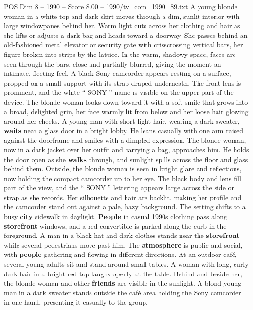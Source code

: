 \begin{textsample}{POS Dim 8 – 1990 – Score 8.00 – 1990/tv\_com\_1990\_89.txt}  \label{ex:f8_pos_062}
A young blonde woman in a white top and dark skirt moves through a dim, sunlit interior with large windowpanes behind her.
Warm light cuts across her clothing and hair as she lifts or adjusts a dark bag and heads toward a doorway.
She passes behind an old-fashioned metal elevator or security gate with crisscrossing vertical bars, her figure broken into strips by the lattice.
In the warm, shadowy space, faces are seen through the bars, close and partially blurred, giving the moment an intimate, fleeting feel.
A black Sony camcorder appears resting on a surface, propped on a small support with its strap draped underneath.
The front lens is prominent, and the white “ SONY ” name is visible on the upper part of the device.
The blonde woman looks down toward it with a soft smile that grows into a broad, delighted grin, her face warmly lit from below and her loose hair glowing around her cheeks.
A young man with short light hair, wearing a dark sweater, \textbf{waits} near a glass door in a bright lobby.
He leans casually with one arm raised against the doorframe and smiles with a dimpled expression.
The blonde woman, now in a dark jacket over her outfit and carrying a bag, approaches him.
He holds the door open as she \textbf{walks} through, and sunlight spills across the floor and glass behind them.
Outside, the blonde woman is seen in bright glare and reflections, now holding the compact camcorder up to her eye.
The black body and lens fill part of the view, and the “ SONY ” lettering appears large across the side or strap as she records.
Her silhouette and hair are backlit, making her profile and the camcorder stand out against a pale, hazy background.
The setting shifts to a busy \textbf{city} sidewalk in daylight. \textbf{People} in casual 1990s clothing pass along \textbf{storefront} windows, and a red convertible is parked along the curb in the foreground.
A man in a black hat and dark clothes stands near the \textbf{storefront} while several pedestrians move past him.
The \textbf{atmosphere} is public and social, with \textbf{people} gathering and flowing in different directions.
At an outdoor café, several young adults sit and stand around small tables.
A woman with long, curly dark hair in a bright red top laughs openly at the table.
Behind and beside her, the blonde woman and other \textbf{friends} are visible in the sunlight.
A blond young man in a dark sweater stands outside the café area holding the Sony camcorder in one hand, presenting it casually to the group.

\end{textsample}
